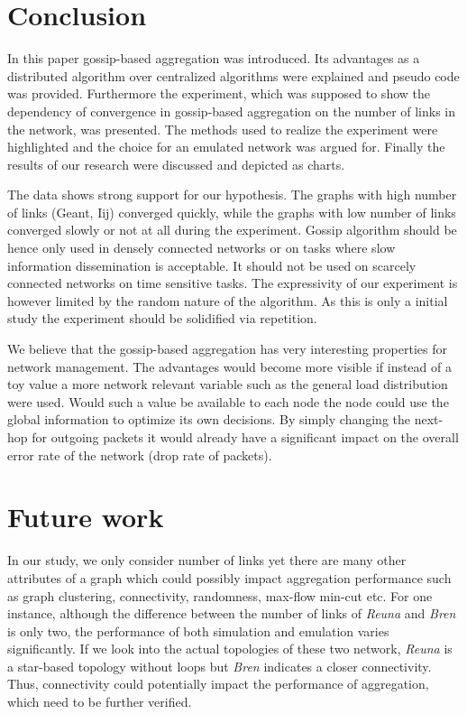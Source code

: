 \section{Conclusion}
\label{sec:conclusion}

In this paper gossip-based aggregation was introduced. Its advantages as a distributed algorithm over centralized algorithms were explained and pseudo code was provided. Furthermore the experiment, which was supposed to show the dependency of convergence in gossip-based aggregation on the number of links in the network, was presented. The methods used to realize the experiment were highlighted and the choice for an emulated network was argued for. Finally the results of our research were discussed and depicted as charts.

The data shows strong support for our hypothesis. The graphs with high number of links (Geant, Iij) converged quickly, while the graphs with low number of links converged slowly or not at all during the experiment. Gossip algorithm should be hence only used in densely connected networks or on tasks where slow information dissemination is acceptable. It should not be used on scarcely connected networks on time sensitive tasks. The expressivity of our experiment is however limited by the random nature of the algorithm. As this is only a initial study the experiment should be solidified via repetition.

We believe that the gossip-based aggregation has very interesting properties for network management. The advantages would become more visible if instead of a toy value a more network relevant variable such as the general load distribution were used. Would such a value be available to each node the node could use the global information to optimize its own decisions. By simply changing the next-hop for outgoing packets it would already have a significant impact on the overall error rate of the network (drop rate of packets).

\section{Future work}
\label{sec:future}
In our study, we only consider number of links yet there are many other attributes of a graph which could possibly impact aggregation performance such as graph clustering\cite{Schaeffer200727}, connectivity, randomness, max-flow min-cut etc. For one instance, although the difference between the number of links of {\it Reuna} and {\it Bren} is only two, the performance of both simulation and emulation varies significantly. If we look into the actual topologies of these two network, {\it Reuna} is a star-based topology without loops but {\it Bren} indicates a closer connectivity. Thus, connectivity could potentially impact the performance of aggregation, which need to be further verified.

